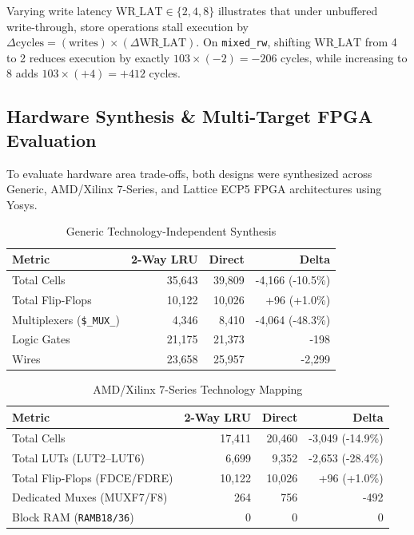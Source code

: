 \documentclass[journal,10pt,twocolumn]{IEEEtran}
\begin{document}
Varying write latency $\text{WR\_LAT} \in \{2, 4, 8\}$ illustrates that under unbuffered write-through, store operations stall execution by $\Delta\text{cycles} = (\text{writes}) \times (\Delta\text{WR\_LAT})$. On \texttt{mixed\_rw}, shifting $\text{WR\_LAT}$ from 4 to 2 reduces execution by exactly $103 \times (-2) = -206$ cycles, while increasing to 8 adds $103 \times (+4) = +412$ cycles.

\subsection{Hardware Synthesis \& Multi-Target FPGA Evaluation}
To evaluate hardware area trade-offs, both designs were synthesized across Generic, AMD/Xilinx 7-Series, and Lattice ECP5 FPGA architectures using Yosys.

\begin{table}[htbp]
\centering
\caption{Generic Technology-Independent Synthesis}
\label{tab:generic_synth}
\begin{tabular}{lrrr}
\toprule
\textbf{Metric} & \textbf{2-Way LRU} & \textbf{Direct} & \textbf{Delta} \\
\midrule
Total Cells & 35,643 & 39,809 & -4,166 (-10.5\%) \\
Total Flip-Flops & 10,122 & 10,026 & +96 (+1.0\%) \\
Multiplexers (\texttt{\$\_MUX\_}) & 4,346 & 8,410 & -4,064 (-48.3\%) \\
Logic Gates & 21,175 & 21,373 & -198 \\
Wires & 23,658 & 25,957 & -2,299 \\
\bottomrule
\end{tabular}
\end{table}

\begin{table}[htbp]
\centering
\caption{AMD/Xilinx 7-Series Technology Mapping}
\label{tab:xilinx_synth}
\begin{tabular}{lrrr}
\toprule
\textbf{Metric} & \textbf{2-Way LRU} & \textbf{Direct} & \textbf{Delta} \\
\midrule
Total Cells & 17,411 & 20,460 & -3,049 (-14.9\%) \\
Total LUTs (LUT2--LUT6) & 6,699 & 9,352 & -2,653 (-28.4\%) \\
Total Flip-Flops (FDCE/FDRE) & 10,122 & 10,026 & +96 (+1.0\%) \\
Dedicated Muxes (MUXF7/F8) & 264 & 756 & -492 \\
Block RAM (\texttt{RAMB18/36}) & 0 & 0 & 0 \\
\bottomrule
\end{tabular}
\end{table}
\end{document}
